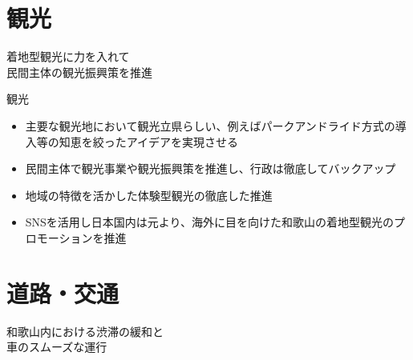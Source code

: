\documentclass[dvipdfmx]{beamer}
\begin{document}
\section{観光}
    \begin{frame}{}{}
        \sectionpage
        \begin{center}
            \begin{large}
                \alert{着地型観光に力を入れて}\\\alert{民間主体の観光振興策を推進}
            \end{large}
        \end{center}
    \end{frame}

    \begin{frame}{観光}{}
        \begin{small}
            \begin{itemize}
                \setlength{\parsep}{.5mm}
                \setlength{\itemsep}{2mm}
                \item 主要な観光地において観光立県らしい、例えばパークアンドライド方式の導入等の知恵を絞ったアイデアを実現させる
                \item 民間主体で観光事業や観光振興策を推進し、行政は徹底してバックアップ
                \item 地域の特徴を活かした体験型観光の徹底した推進
                \item SNSを活用し日本国内は元より、海外に目を向けた和歌山の着地型観光のプロモーションを推進
            \end{itemize}
        \end{small}
    \end{frame}

\section{道路・交通}
    \begin{frame}{}{}
        \sectionpage
        \begin{center}
            \begin{large}
                \alert{和歌山内における渋滞の緩和と}\\\alert{車のスムーズな運行}
            \end{large}
        \end{center}
    \end{frame}
\end{document}

